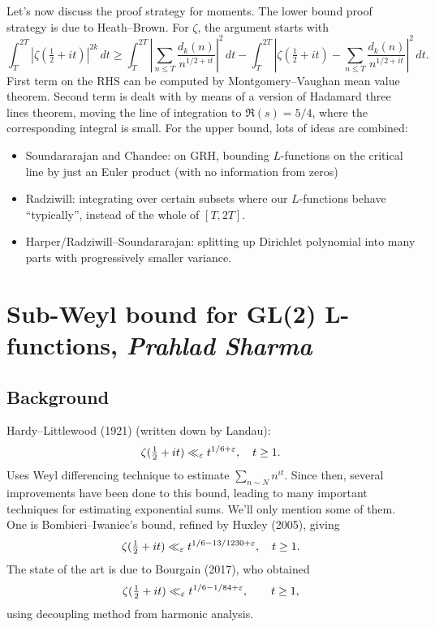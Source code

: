 \documentclass[reqno]{amsart} 
\begin{document}
Let's now discuss the proof strategy for moments.  The lower bound proof strategy is due to Heath--Brown.  For $\zeta$, the argument starts with
\begin{equation*}
  \int_T^{2 T}
  \left| \zeta(\tfrac{1}{2} + i t) \right|^{2 k} \, d t
  \geq
  \int_T^{2 T}
  \left| \sum_{n \leq T}
    \frac{d_k(n)}{n^{1/2 + i t}}\right|^2 \, d t
  - \int_T^{2 T}
  \left| \zeta(\tfrac{1}{2} + i t)
    - \sum_{n \leq T}
    \frac{d_k(n)}{n^{1/2 + i t}}\right|^2 \,d t.
\end{equation*}
First term on the RHS can be computed by Montgomery--Vaughan mean value theorem.  Second term is dealt with by means of a version of Hadamard three lines theorem, moving the line of integration to $\Re(s) = 5/4$, where the corresponding integral is small.  For the upper bound, lots of ideas are combined:
\begin{itemize}
\item Soundararajan and Chandee: on GRH, bounding $L$-functions on the critical line by just an Euler product (with no information from zeros)
\item Radziwill: integrating over certain subsets where our $L$-functions behave ``typically'', instead of the whole of $[T, 2 T]$.
\item Harper/Radziwill--Soundararajan: splitting up Dirichlet polynomial into many parts with progressively smaller variance.
\end{itemize}

\section{Sub-Weyl bound for GL(2) L-functions, \textnormal{\emph{Prahlad Sharma}}}

\subsection{Background}

Hardy--Littlewood (1921) (written down by Landau):
\begin{equation*}
  \zeta(\tfrac{1}{2} + i t) \ll_\varepsilon t^{1/6 + \varepsilon}, \quad t \geq 1.
\end{equation*}
Uses Weyl differencing technique to estimate $\sum_{n \sim N} n^{i t}$.  Since then, several improvements have been done to this bound, leading to many important techniques for estimating exponential sums.  We'll only mention some of them.  One is Bombieri--Iwaniec's bound, refined by Huxley (2005), giving
\begin{equation*}
  \zeta(\tfrac{1}{2} + i t) \ll_\varepsilon t^{1/6 - 13/1230 + \varepsilon}, \quad t \geq 1.
\end{equation*}
The state of the art is due to Bourgain (2017), who obtained
\begin{equation*}
  \zeta(\tfrac{1}{2} + i t) \ll_\varepsilon t^{1/6 - 1/84 + \varepsilon}, \qquad t \geq 1,
\end{equation*}
using decoupling method from harmonic analysis.
\end{document}
